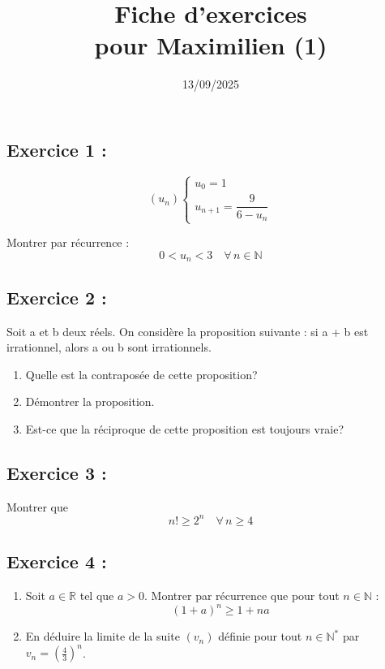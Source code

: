 \documentclass[12pt,a4paper]{article}
\title{Fiche d'exercices \\ pour Maximilien (1)}
\date{13/09/2025}
\author{}
\begin{document}
\maketitle

\subsection*{Exercice 1 : }

\[
(u_n) \begin{cases} 
u_0 = 1 \\ 
u_{n+1} = \dfrac{9}{6 - u_n}
\end{cases}
\]

Montrer par récurrence :  
\[0 < u_n < 3 \quad \forall \, n \in \mathbb{N}\]

\bigskip

\subsection*{Exercice 2 : }
Soit a et b deux réels. On considère la proposition suivante : si a + b est irrationnel, alors a ou b sont irrationnels.

\begin{enumerate}
    \item Quelle est la contraposée de cette proposition?
    \item Démontrer la proposition.
    \item Est-ce que la réciproque de cette proposition est toujours vraie?
\end{enumerate}

\bigskip

\subsection*{Exercice 3 : }
Montrer que 
\[
n! \geq 2^n \quad \forall \, n \geq 4
\]

\bigskip


\subsection*{Exercice 4 :}
 
\begin{enumerate}
    \item Soit $a \in \mathbb{R}$ tel que $a > 0$. Montrer par récurrence que pour tout $n \in \mathbb{N}$ :
    \[
    (1 + a)^n \ge 1 + n a
    \]
    \item En déduire la limite de la suite $(v_n)$ définie pour tout $n \in \mathbb{N}^*$ par $v_n = \left(\frac{4}{3}\right)^n$.
\end{enumerate}
\end{document}
